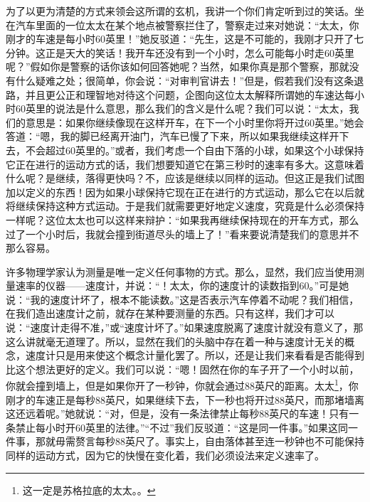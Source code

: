 \documentclass[12pt,oneside]{book}
\begin{document}
\begin{common-format}
为了以更为清楚的方式来领会这所谓的玄机，我讲一个你们肯定听到过的笑话。坐在汽车里面的一位太太在某个地点被警察拦住了，警察走过来对她说：“太太，你刚才的车速是每小时60英里！”她反驳道：“先生，这是不可能的，我刚才只开了七分钟。这正是天大的笑话！我开车还没有到一个小时，怎么可能每小时走60英里呢？”假如你是警察的话你该如何回答她呢？当然，如果你真是那个警察，那就没有什么疑难之处；很简单，你会说：“对审判官讲去！”但是，假若我们没有这条退路，并且更公正和理智地对待这个问题，企图向这位太太解释所谓她的车速达每小时60英里的说法是什么意思，那么我们的含义是什么呢？我们可以说：“太太，我们的意思是：如果你继续像现在这样开车，在下一个小时里你将开过60英里。”她会答道：“嗯，我的脚已经离开油门，汽车已慢了下来，所以如果我继续这样开下去，不会超过60英里的。”或者，我们考虑一个自由下落的小球，如果这个小球保持它正在进行的运动方式的话，我们想要知道它在第三秒时的速率有多大。这意味着什么呢？是继续，落得更快吗？不，应该是继续以同样的运动。但这正是我们试图加以定义的东西！因为如果小球保持它现在正在进行的方式运动，那么它在以后就将继续保持这种方式运动。于是我们就需要更好地定义速度，究竟是什么必须保持一样呢？这位太太也可以这样来辩护：“如果我再继续保持现在的开车方式，那么过了一个小时后，我就会撞到街道尽头的墙上了！”看来要说清楚我们的意思并不那么容易。

许多物理学家认为测量是唯一定义任何事物的方式。那么，显然，我们应当使用测量速率的仪器——速度计，并说：“！太太，你的速度计的读数指到60。”可是她说：“我的速度计坏了，根本不能读数。”这是否表示汽车停着不动呢？我们相信，在我们造出速度计之前，就存在某种要测量的东西。只有这样，我们才可以说：“速度计走得不准，”或“速度计坏了。”如果速度脱离了速度计就没有意义了，那这么讲就毫无道理了。所以，显然在我们的头脑中存在着一种与速度计无关的概念，速度计只是用来使这个概念计量化罢了。所以，还是让我们来看看是否能得到比这个想法更好的定义。我们可以说：“嗯！固然在你的车子开了一个小时以前，你就会撞到墙上，但是如果你开了一秒钟，你就会通过88英尺的距离。太太\footnote{这一定是苏格拉底的太太。。}，你刚才的车速正是每秒88英尺，如果继续下去，下一秒也将开过88英尺，而那堵墙离这还远着呢。”她就说：“对，但是，没有一条法律禁止每秒88英尺的车速！只有一条禁止每小时开60英里的法律。”“不过”我们反驳道：“这是同一件事。”如果这同一件事，那就毋需赘言每秒88英尺了。事实上，自由落体甚至连一秒钟也不可能保持同样的运动方式，因为它的快慢在变化着，我们必须设法来定义速率了。


\end{common-format}
\end{document}

